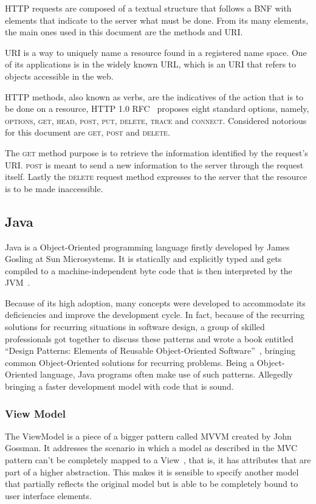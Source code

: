 \gls{HTTP} requests are composed of a textual structure that follows a \gls{BNF} with elements that indicate to the server what must be done. From its many elements, the main ones used in this document are the methods and \gls{URI}.

\gls{URI} is a way to uniquely name a resource found in a registered name space. One of its applications is in the widely known \gls{URL}, which is an \gls{URI} that refers to objects accessible in the web.

\gls{HTTP} methods, also known as verbs, are the indicatives of the action that is to be done on a resource, \gls{HTTP} 1.0 \gls{RFC}~\cite{http} proposes eight standard options, namely, \textsc{options}, \textsc{get}, \textsc{head}, \textsc{post}, \textsc{put}, \textsc{delete}, \textsc{trace} and \textsc{connect}. Considered notorious for this document are \textsc{get}, \textsc{post} and \textsc{delete}.

The \textsc{get} method purpose is to retrieve the information identified by the request's \gls{URI}. \textsc{post} is meant to send a new information to the server through the request itself. Lastly the \textsc{delete} request method expresses to the server that the resource is to be made inaccessible.

\subsection{Java}
Java is a Object-Oriented programming language firstly developed by James Gosling at Sun Microsystems. It is statically and explicitly typed and gets compiled to a machine-independent byte code that is then interpreted by the \gls{JVM}~\cite{java}.

Because of its high adoption, many concepts were developed to accommodate its deficiencies and improve the development cycle. In fact, because of the recurring solutions for recurring situations in software design, a group of skilled professionals got together to discuss these patterns and wrote a book entitled ``Design Patterns: Elements of Reusable Object-Oriented Software''~\cite{patterns}, bringing common Object-Oriented solutions for recurring problems. Being a Object-Oriented language, Java programs often make use of such patterns. Allegedly bringing a faster development model with code that is sound.

\subsubsection{View Model}
The ViewModel is a piece of a bigger pattern called \gls{MVVM} created by John Gossman. It addresses the scenario in which a model as described in the \gls{MVC} pattern can't be completely mapped to a View~\cite{viewmodel}, that is, it has attributes that are part of a higher abstraction. This makes it is sensible to specify another model that partially reflects the original model but is able to be completely bound to user interface elements.

